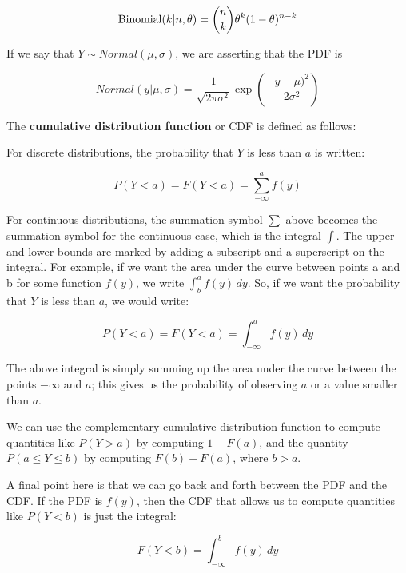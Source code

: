 \documentclass[12pt,]{krantz}
\begin{document}
\begin{equation}
\hbox{Binomial}(k|n,\theta) = 
\binom{n}{k} \theta^{k} (1-\theta)^{n-k}
\end{equation}

If we say that \(Y\sim Normal(\mu,\sigma)\), we are asserting that the PDF is

\begin{equation}
Normal(y|\mu,\sigma)= \frac{1}{\sqrt{2\pi \sigma^2}} \exp \left(-\frac{y-\mu)^2}{2\sigma^2} \right)
\end{equation}

The \textbf{cumulative distribution function} or CDF is defined as follows:

For discrete distributions, the probability that \(Y\) is less than \(a\) is written:

\begin{equation}
P(Y<a) = F(Y<a) =\sum_{-\infty}^{a} f(y)
\end{equation}

For continuous distributions, the summation symbol \(\sum\) above becomes the summation symbol for the continuous case, which is the integral \(\int\). The upper and lower bounds are marked by adding a subscript and a superscript on the integral. For example, if we want the area under the curve between points a and b for some function \(f(y)\), we write \(\int_b^a f(y)\, dy\). So, if we want the probability that \(Y\) is less than \(a\), we would write:

\begin{equation}
P(Y<a) = F(Y<a) =\int_{-\infty}^{a} f(y)\, dy
\end{equation}

The above integral is simply summing up the area under the curve between the points \(-\infty\) and \(a\); this gives us the probability of observing \(a\) or a value smaller than \(a\).

We can use the complementary cumulative distribution function to compute quantities like \(P(Y>a)\) by computing \(1-F(a)\), and the quantity \(P(a\leq Y\leq b)\) by computing \(F(b)-F(a)\), where \(b>a\).

A final point here is that we can go back and forth between the PDF and the CDF. If the PDF is \(f(y)\), then the CDF that allows us to compute quantities like \(P(Y<b)\) is just the integral:

\begin{equation}
F(Y<b)=\int_{-\infty}^b f(y)\, dy
\end{equation}
\end{document}
